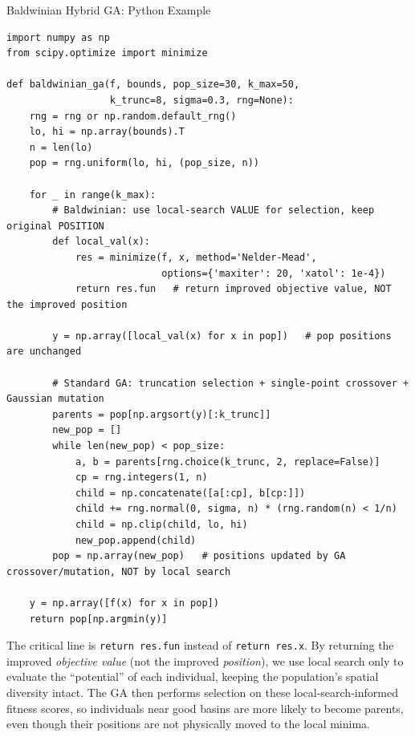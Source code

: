 \documentclass[aspectratio=169,10pt]{beamer}
\begin{document}
\begin{frame}[fragile]{Baldwinian Hybrid GA: Python Example}
\begin{lstlisting}[style=python, caption={Baldwinian hybrid GA with local refinement (Python / SciPy)}]
import numpy as np
from scipy.optimize import minimize

def baldwinian_ga(f, bounds, pop_size=30, k_max=50,
                  k_trunc=8, sigma=0.3, rng=None):
    rng = rng or np.random.default_rng()
    lo, hi = np.array(bounds).T
    n = len(lo)
    pop = rng.uniform(lo, hi, (pop_size, n))

    for _ in range(k_max):
        # Baldwinian: use local-search VALUE for selection, keep original POSITION
        def local_val(x):
            res = minimize(f, x, method='Nelder-Mead',
                           options={'maxiter': 20, 'xatol': 1e-4})
            return res.fun   # return improved objective value, NOT the improved position

        y = np.array([local_val(x) for x in pop])   # pop positions are unchanged

        # Standard GA: truncation selection + single-point crossover + Gaussian mutation
        parents = pop[np.argsort(y)[:k_trunc]]
        new_pop = []
        while len(new_pop) < pop_size:
            a, b = parents[rng.choice(k_trunc, 2, replace=False)]
            cp = rng.integers(1, n)
            child = np.concatenate([a[:cp], b[cp:]])
            child += rng.normal(0, sigma, n) * (rng.random(n) < 1/n)
            child = np.clip(child, lo, hi)
            new_pop.append(child)
        pop = np.array(new_pop)   # positions updated by GA crossover/mutation, NOT by local search

    y = np.array([f(x) for x in pop])
    return pop[np.argmin(y)]
\end{lstlisting}

  The critical line is \texttt{return res.fun} instead of
  \texttt{return res.x}.  By returning the improved \emph{objective
  value} (not the improved \emph{position}), we use local search
  only to evaluate the ``potential'' of each individual, keeping
  the population's spatial diversity intact.  The GA then performs
  selection on these local-search-informed fitness scores, so
  individuals near good basins are more likely to become parents,
  even though their positions are not physically moved to the local
  minima.

\end{frame}
\end{document}
